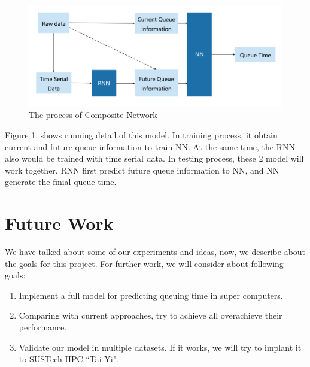 \documentclass[conference,compsoc]{IEEEtran}
\begin{document}
	\begin{figure}[htbp]   %
	\centering
	\includegraphics[width=\linewidth,scale=1.00]{CompositeNetwork.png}
	\caption{The process of Composite Network}
	\label{CompositeNetwork.png}
	\end{figure}

	Figure \ref{CompositeNetwork.png}. shows running detail of this model. In training process, it obtain current and future queue information to train NN. At the same time, the RNN also would be trained with time serial data. In testing process, these 2 model will work together. RNN first predict future queue information to NN, and NN generate the finial queue time.

\section{Future Work}
	We have talked about some of our experiments and ideas, now, we describe about the goals for this project. For further work, we will consider about following goals:
	\begin{enumerate}
		\item Implement a full model for predicting queuing time in super computers.
		\item Comparing with current approaches, try to achieve all overachieve their performance.
		\item Validate our model in multiple datasets. If it works, we will try to implant it to SUSTech HPC ``Tai-Yi".
	\end{enumerate}









\end{document}

